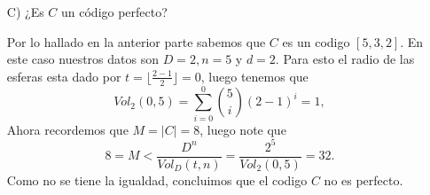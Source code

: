 \begin{itemize}
\begin{sols}
    \end{sols}
    \item[C)]¿Es $C$ un código perfecto?
    \begin{sols}
        Por lo hallado en la anterior parte sabemos que $C$ es un codigo $[5,3,2].$ En este caso nuestros datos son $D=2,n=5$ y $d=2.$ Para esto el radio de las esferas esta dado por $t=\lfloor\frac{2-1}{2}\rfloor=0$, luego tenemos que
        $$Vol_2(0,5)=\sum_{i=0}^0\binom{5}{i}(2-1)^i=1,$$ Ahora recordemos que $M=|C|=8$, luego note que
        $$8=M<\frac{D^n}{Vol_D(t,n)}=\frac{2^5}{Vol_2(0,5)}=32.$$
        Como no se tiene la igualdad, concluimos que el codigo $C$ no es perfecto.
        
    \end{sols}
\end{itemize}
